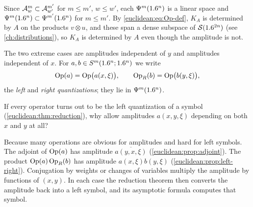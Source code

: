 Since $\mathcal{A}^{m}_{w}\subset\mathcal{A}^{m'}_{w'}$ for $m\le m'$, $w\le w'$, each
$\Psi^{m}(1.6^n)$ is a linear space and $\Psi^{m}(1.6^n)\subset\Psi^{m'}(1.6^n)$
for $m\le m'$. By \eqref{euclidean:eq:Op-def}, $K_A$ is determined by $A$ on
the products $v\otimes u$, and these span a dense subspace of $\mathcal{S}(1.6^{2n})$
(see \cref{ch:distributions}), so $K_A$ is determined by $A$ even though the
amplitude is not.

The two extreme cases are amplitudes independent of $y$ and amplitudes
independent of $x$. For $a,b\in S^m(1.6^n;1.6^n)$ we write
\begin{equation*}
  \operatorname{Op}(a)=\operatorname{Op}\bigl(a(x,\xi)\bigr),\qquad\operatorname{Op}_R(b)=\operatorname{Op}\bigl(b(y,\xi)\bigr),
\end{equation*}
the \emph{left} and \emph{right quantizations}; they lie in $\Psi^{m}(1.6^n)$.

\begin{question}
If every operator turns out to be the left quantization of a symbol
(\cref{euclidean:thm:reduction}), why allow amplitudes $a(x,y,\xi)$ depending on both
$x$ and $y$ at all?
\end{question}
\begin{answer}
Because many operations are obvious for amplitudes and hard for left symbols. The
adjoint of $\operatorname{Op}(a)$ has amplitude $\overline{a(y,x,\xi)}$
(\cref{euclidean:prop:adjoint}). The product $\operatorname{Op}(a)\operatorname{Op}_R(b)$ has amplitude
$a(x,\xi)b(y,\xi)$ (\cref{euclidean:prop:left-right}). Conjugation by weights or changes
of variables multiply the amplitude by functions of $(x,y)$. In each case the
reduction theorem then converts the amplitude back into a left symbol, and its
asymptotic formula computes that symbol.
\end{answer}

